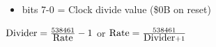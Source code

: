 \begin{itemize}
\item bits 7-0 = Clock divide value (\$0B on reset)
\end{itemize}
$\hbox{Divider}=\frac{538461}{\hbox{Rate}}-1$ or $\hbox{Rate}=\frac{538461}{\hbox{Divider}+1}$

